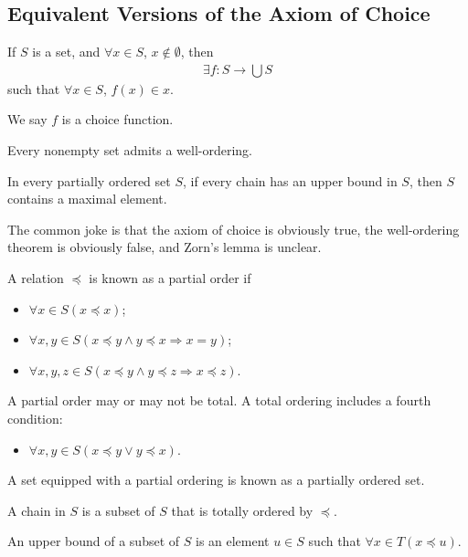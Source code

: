 \documentclass[10pt]{mypackage}
\begin{document}
\subsection{Equivalent Versions of the Axiom of Choice}%
\begin{theorem}
  If $S$ is a set, and $\forall x\in S$, $x\notin \emptyset$, then
  \begin{align*}
    \exists f: S\rightarrow \bigcup S
  \end{align*}
  such that $\forall x\in S$, $f(x)\in x$.\newline

  We say $f$ is a choice function.
\end{theorem}
\begin{theorem}
  Every nonempty set admits a well-ordering.
\end{theorem}
\begin{theorem}
  In every partially ordered set $S$, if every chain has an upper bound in $S$, then $S$ contains a maximal element.
\end{theorem}
The common joke is that the axiom of choice is obviously true, the well-ordering theorem is obviously false, and Zorn's lemma is unclear.
\begin{definition}
  A relation $\preceq$ is known as a partial order if
  \begin{itemize}
    \item $\forall x\in S \left(x\preceq x\right)$;
    \item $\forall x,y\in S\left(x\preceq y \wedge y\preceq x \Rightarrow x = y\right)$;
    \item $\forall x,y,z\in S\left(x\preceq y\wedge y\preceq z \Rightarrow x\preceq z\right)$.
  \end{itemize}
  A partial order may or may not be total. A total ordering includes a fourth condition:
  \begin{itemize}
    \item $\forall x,y\in S\left(x\preceq y \vee y\preceq x\right)$.
  \end{itemize}
  A set equipped with a partial ordering is known as a partially ordered set.
\end{definition}
\begin{definition}[Chain]
  A chain in $S$ is a subset of $S$ that is totally ordered by $\preceq$.
\end{definition}
\begin{definition}
  An upper bound of a subset of $S$ is an element $u\in S$ such that $\forall x\in T\left(x\preceq u\right)$.
\end{definition}
\end{document}
